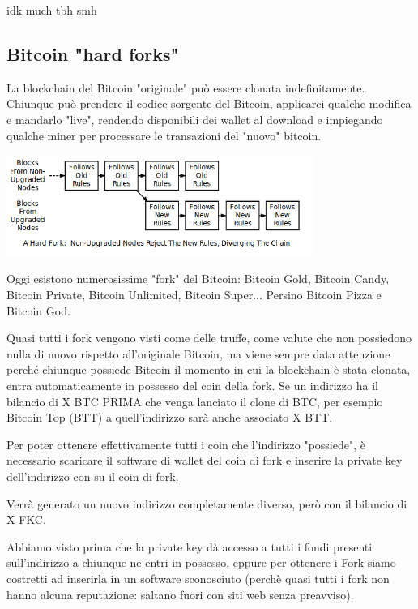 \documentclass {article}
\begin{document}
idk much tbh smh



\subsection {Bitcoin "hard forks"}



La blockchain del Bitcoin "originale" può essere clonata indefinitamente. Chiunque può prendere il codice sorgente del Bitcoin, applicarci qualche modifica e mandarlo "live", rendendo disponibili dei wallet al download e impiegando qualche miner per processare le transazioni del "nuovo" bitcoin.



\includegraphics [width = 10cm] {media/hard_fork.png}



Oggi esistono numerosissime "fork" del Bitcoin: Bitcoin Gold, Bitcoin Candy, Bitcoin Private, Bitcoin Unlimited, Bitcoin Super... Persino Bitcoin Pizza e Bitcoin God.

Quasi tutti i fork vengono visti come delle truffe, come valute che non possiedono nulla di nuovo rispetto all'originale Bitcoin, ma viene sempre data attenzione perché chiunque possiede Bitcoin il momento in cui la blockchain è stata clonata, entra automaticamente in possesso del coin della fork. Se un indirizzo ha il bilancio di X BTC PRIMA che venga lanciato il clone di BTC, per esempio Bitcoin Top (BTT) a quell'indirizzo sarà anche associato X BTT.

Per poter ottenere effettivamente tutti i coin che l'indirizzo "possiede", è necessario scaricare il software di wallet del coin di fork e inserire la private key dell'indirizzo con su il coin di fork.

Verrà generato un nuovo indirizzo completamente diverso, però con il bilancio di X FKC.

Abbiamo visto prima che la private key dà accesso a tutti i fondi presenti sull'indirizzo a chiunque ne entri in possesso, eppure per ottenere i Fork siamo costretti ad inserirla in un software sconosciuto (perchè quasi tutti i fork non hanno alcuna reputazione: saltano fuori con siti web senza preavviso).
\end{document}
